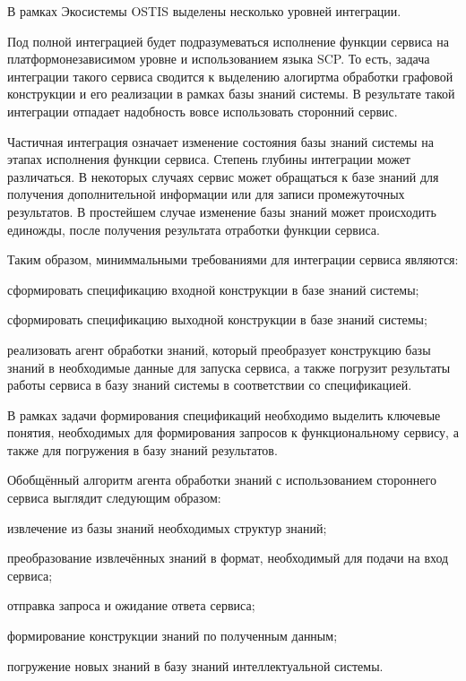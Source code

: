 В рамках Экосистемы OSTIS выделены несколько уровней интеграции. 

Под полной интеграцией будет подразумеваться исполнение функции сервиса на платформонезависимом уровне и использованием языка SCP. То есть, задача интеграции такого сервиса сводится к выделению алогиртма обработки графовой конструкции и его реализации в рамках базы знаний системы. В результате такой интеграции отпадает надобность вовсе использовать сторонний сервис. 

Частичная интеграция означает изменение состояния базы знаний системы на этапах исполнения функции сервиса. Степень глубины интеграции может различаться. В некоторых случаях сервис может обращаться к базе знаний для получения дополнительной информации или для записи промежуточных результатов. В простейшем случае изменение базы знаний может происходить единожды, после получения результата отработки функции сервиса. 

Таким образом, миниммальными требованиями для интеграции сервиса являются:
\begin{textitemize}
    \item сформировать спецификацию входной конструкции в базе знаний системы;
    \item сформировать спецификацию выходной конструкции в базе знаний системы;
    \item реализовать агент обработки знаний, который преобразует конструкцию базы знаний в необходимые данные для запуска сервиса, а также погрузит результаты работы сервиса в базу знаний системы в соответствии со спецификацией.
\end{textitemize}

В рамках задачи формирования спецификаций необходимо выделить ключевые понятия, необходимых для формирования запросов к функциональному сервису, а также для погружения в базу знаний результатов.

Обобщённый алгоритм агента обработки знаний с использованием стороннего сервиса выглядит следующим образом:
\begin{textitemize}
    \item извлечение из базы знаний необходимых структур знаний;
    \item преобразование извлечённых знаний в формат, необходимый для подачи на вход сервиса;
    \item отправка запроса и ожидание ответа сервиса;
    \item формирование конструкции знаний по полученным данным;
    \item погружение новых знаний в базу знаний интеллектуальной системы.
\end{textitemize}

